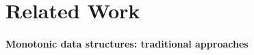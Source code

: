 \section{Related Work}
\label{section:related}



\paragraph{Monotonic data structures: traditional approaches}

